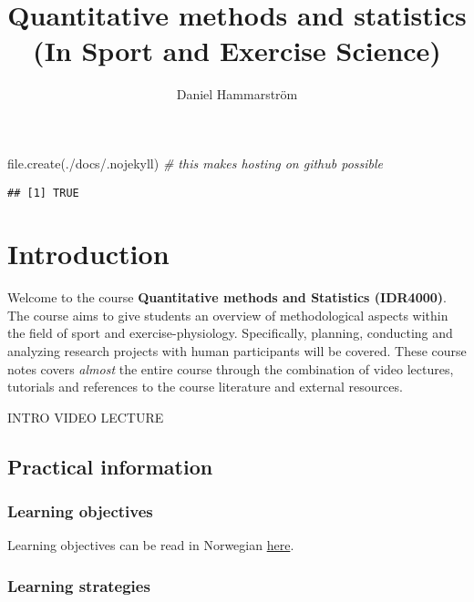 \documentclass[
]{article}
\title{Quantitative methods and statistics (In Sport and Exercise Science)}
\author{Daniel Hammarström}
\date{}
\newenvironment{Shaded}{\begin{snugshade}}{\end{snugshade}}
\newcommand{\CommentTok}[1]{\textcolor[rgb]{0.56,0.35,0.01}{\textit{#1}}}
\newcommand{\FunctionTok}[1]{\textcolor[rgb]{0.00,0.00,0.00}{#1}}
\newcommand{\NormalTok}[1]{#1}
\newcommand{\StringTok}[1]{\textcolor[rgb]{0.31,0.60,0.02}{#1}}
\begin{document}
\maketitle

{
\setcounter{tocdepth}{2}
\tableofcontents
}
\begin{Shaded}
\begin{Highlighting}[]
\FunctionTok{file.create}\NormalTok{(}\StringTok{\textquotesingle{}./docs/.nojekyll\textquotesingle{}}\NormalTok{) }\CommentTok{\# this makes hosting on github possible}
\end{Highlighting}
\end{Shaded}

\begin{verbatim}
## [1] TRUE
\end{verbatim}

\hypertarget{introduction}{%
\section*{Introduction}\label{introduction}}

Welcome to the course \textbf{Quantitative methods and Statistics (IDR4000)}. The course aims to give students an overview of methodological aspects within the field of sport and exercise-physiology. Specifically, planning, conducting and analyzing research projects with human participants will be covered. These course notes covers \emph{almost} the entire course through the combination of video lectures, tutorials and references to the course literature and external resources.

INTRO VIDEO LECTURE

\hypertarget{practical-information}{%
\subsection{Practical information}\label{practical-information}}

\hypertarget{learning-objectives}{%
\subsubsection{Learning objectives}\label{learning-objectives}}

Learning objectives can be read in Norwegian \href{https://www.inn.no/content/view/full/163709/language/nor-NO}{here}.

\hypertarget{learning-strategies}{%
\subsubsection{Learning strategies}\label{learning-strategies}}
\end{document}
